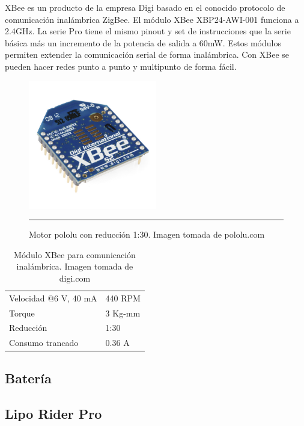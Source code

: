 XBee es un producto de la empresa Digi basado en el conocido protocolo de comunicación inalámbrica ZigBee. El módulo XBee XBP24-AWI-001 funciona a 2.4GHz. La serie Pro tiene el mismo pinout y set de instrucciones que la serie básica más un incremento de la potencia de salida a 60mW. Estos módulos permiten extender la comunicación serial de forma inalámbrica. Con XBee se pueden hacer redes punto a punto y multipunto de forma fácil.

\begin{figure}[htbp]
	\centering
		\includegraphics[width=0.5\textwidth]{./Figures/MODI/xbee.jpg}
		\rule{35em}{0.5pt}
	\caption[MotorDC]{Motor pololu con reducción 1:30. Imagen tomada de pololu.com}
	\label{fig:MotorDC}
\end{figure}

\begin{table}
    \begin{tabular}{l|l}
    Velocidad @6 V, 40 mA &  440 RPM \\
    Torque                & 3 Kg-mm  \\
    Reducción             & 1:30     \\
    Consumo trancado      & 0.36 A   \\
    \end{tabular}
        \caption[Xbee]{Módulo XBee para comunicación inalámbrica. Imagen tomada de digi.com}
	\label{table:Xbee}
\end{table}


\subsection{Batería}

\subsection{Lipo Rider Pro}

